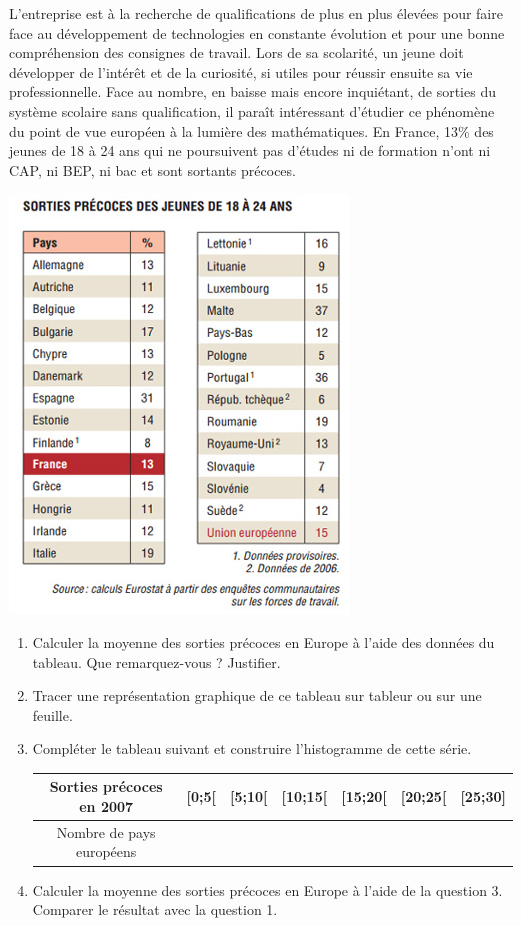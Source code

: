 
\begin{minipage}[top]{10cm}
L'entreprise est à la recherche de qualifications de plus en plus élevées pour faire face au développement de technologies en constante évolution et pour une bonne compréhension des consignes de travail. Lors de sa scolarité, un jeune doit développer de l'intérêt et de la curiosité, si utiles pour réussir ensuite sa vie professionnelle. Face au nombre, en baisse mais encore inquiétant, de sorties du système scolaire sans qualification, il paraît intéressant d'étudier ce phénomène du point de vue européen à la lumière des mathématiques. En France, 13\% des jeunes de 18 à 24 ans qui ne poursuivent pas d'études ni de formation n'ont ni CAP, ni BEP, ni bac et sont sortants précoces.
\end{minipage}
\begin{minipage}{6cm}
\includegraphics[scale=0.5]{stat12.jpg} 
\end{minipage}

\begin{enumerate}
\item Calculer la moyenne des sorties précoces en Europe à l'aide des données du tableau. Que remarquez-vous ? Justifier.
\item Tracer une représentation graphique de ce tableau sur tableur ou sur une feuille.
\item Compléter le tableau suivant et construire l'histogramme de cette série.

\begin{tabular}{|c|c|c|c|c|c|c|}
\hline 
Sorties précoces en 2007 & [0;5[ & [5;10[ & [10;15[ & [15;20[ & [20;25[ & [25;30] \\ 
\hline 
Nombre de pays européens &  &  &  &  &  &  \\ 
\hline 
\end{tabular} 

\item Calculer la moyenne des sorties précoces en Europe à l'aide de la question 3. Comparer le résultat avec la question 1.  
\end{enumerate}




  